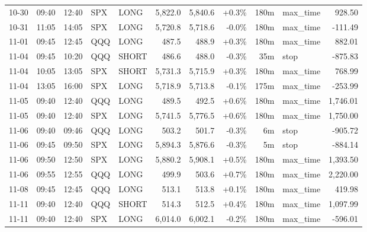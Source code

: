 \documentclass[11pt,a4paper,twoside]{article}
\begin{document}
\begin{center}
\begin{longtable}{>{\color{txtmain}}l l l l l r r r r >{\color{txtmain}}l r}
10-30 & 09:40 & 12:40 & SPX & LONG & 5,822.0 & 5,840.6 & \textcolor{wingreen}{+0.3\%} & 180m & max\_time & \textcolor{wingreen}{928.50} \\
10-31 & 11:05 & 14:05 & SPX & LONG & 5,720.8 & 5,718.6 & \textcolor{lossred}{-0.0\%} & 180m & max\_time & \textcolor{lossred}{-111.49} \\
11-01 & 09:45 & 12:45 & QQQ & LONG & 487.5 & 488.9 & \textcolor{wingreen}{+0.3\%} & 180m & max\_time & \textcolor{wingreen}{882.01} \\
11-04 & 09:45 & 10:20 & QQQ & SHORT & 486.6 & 488.0 & \textcolor{lossred}{-0.3\%} & 35m & stop & \textcolor{lossred}{-875.83} \\
11-04 & 10:05 & 13:05 & SPX & SHORT & 5,731.3 & 5,715.9 & \textcolor{wingreen}{+0.3\%} & 180m & max\_time & \textcolor{wingreen}{768.99} \\
11-04 & 13:05 & 16:00 & SPX & LONG & 5,718.9 & 5,713.8 & \textcolor{lossred}{-0.1\%} & 175m & max\_time & \textcolor{lossred}{-253.99} \\
11-05 & 09:40 & 12:40 & QQQ & LONG & 489.5 & 492.5 & \textcolor{wingreen}{+0.6\%} & 180m & max\_time & \textcolor{wingreen}{1,746.01} \\
11-05 & 09:40 & 12:40 & SPX & LONG & 5,741.5 & 5,776.5 & \textcolor{wingreen}{+0.6\%} & 180m & max\_time & \textcolor{wingreen}{1,750.00} \\
11-06 & 09:40 & 09:46 & QQQ & LONG & 503.2 & 501.7 & \textcolor{lossred}{-0.3\%} & 6m & stop & \textcolor{lossred}{-905.72} \\
11-06 & 09:45 & 09:50 & SPX & LONG & 5,894.3 & 5,876.6 & \textcolor{lossred}{-0.3\%} & 5m & stop & \textcolor{lossred}{-884.14} \\
11-06 & 09:50 & 12:50 & SPX & LONG & 5,880.2 & 5,908.1 & \textcolor{wingreen}{+0.5\%} & 180m & max\_time & \textcolor{wingreen}{1,393.50} \\
11-06 & 09:55 & 12:55 & QQQ & LONG & 499.9 & 503.6 & \textcolor{wingreen}{+0.7\%} & 180m & max\_time & \textcolor{wingreen}{2,220.00} \\
11-08 & 09:45 & 12:45 & QQQ & LONG & 513.1 & 513.8 & \textcolor{wingreen}{+0.1\%} & 180m & max\_time & \textcolor{wingreen}{419.98} \\
11-11 & 09:40 & 12:40 & QQQ & SHORT & 514.3 & 512.5 & \textcolor{wingreen}{+0.4\%} & 180m & max\_time & \textcolor{wingreen}{1,097.99} \\
11-11 & 09:40 & 12:40 & SPX & LONG & 6,014.0 & 6,002.1 & \textcolor{lossred}{-0.2\%} & 180m & max\_time & \textcolor{lossred}{-596.01} \\

\end{longtable}
\end{center}
\end{document}
